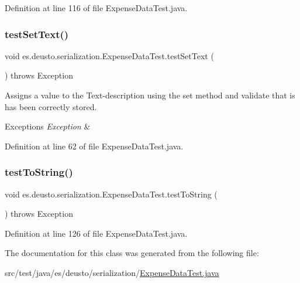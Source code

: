 Definition at line 116 of file Expense\+Data\+Test.\+java.

\mbox{\label{classes_1_1deusto_1_1serialization_1_1_expense_data_test_a9b9120ede1751dc400bbe740d6bfa87e}} 
\subsubsection{\texorpdfstring{test\+Set\+Text()}{testSetText()}}
{\footnotesize\ttfamily void es.\+deusto.\+serialization.\+Expense\+Data\+Test.\+test\+Set\+Text (\begin{DoxyParamCaption}{ }\end{DoxyParamCaption}) throws Exception}

Assigns a value to the Text-\/description using the set method and validate that is has been correctly stored.~\newline
 
\begin{DoxyExceptions}{Exceptions}
{\em Exception} & \\
\hline
\end{DoxyExceptions}


Definition at line 62 of file Expense\+Data\+Test.\+java.

\mbox{\label{classes_1_1deusto_1_1serialization_1_1_expense_data_test_a36e81a35700d9baa7ff9ff65552e32c6}} 
\subsubsection{\texorpdfstring{test\+To\+String()}{testToString()}}
{\footnotesize\ttfamily void es.\+deusto.\+serialization.\+Expense\+Data\+Test.\+test\+To\+String (\begin{DoxyParamCaption}{ }\end{DoxyParamCaption}) throws Exception}



Definition at line 126 of file Expense\+Data\+Test.\+java.



The documentation for this class was generated from the following file\+:\begin{DoxyCompactItemize}
\item 
src/test/java/es/deusto/serialization/\hyperlink{_expense_data_test_8java}{Expense\+Data\+Test.\+java}\end{DoxyCompactItemize}
